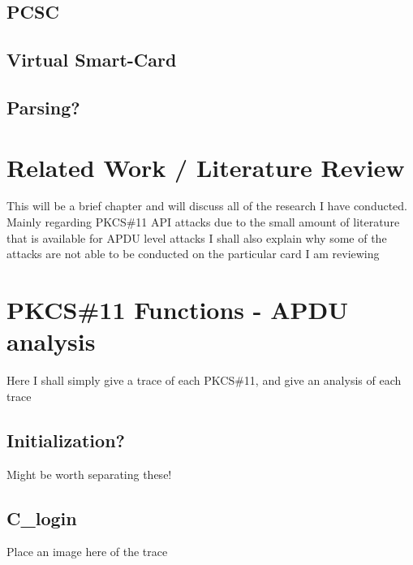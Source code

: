 \documentclass[bsc,frontabs,twoside,singlespacing,parskip,deptreport]{infthesis}     %
\begin{document}
\section{PCSC}

\section{Virtual Smart-Card}

\section{Parsing?}







\chapter{Related Work / Literature Review}

This will be a brief chapter and will discuss all of the research I have conducted.\\
Mainly regarding PKCS\#11 API attacks due to the small amount of literature that is available for APDU level attacks
I shall also explain why some of the attacks are not able to be conducted on the particular card I am reviewing







\chapter{PKCS\#11 Functions - APDU analysis}

Here I shall simply give a trace of each PKCS\#11, and give an analysis of each trace

\section{Initialization?}
Might be worth separating these!
\section{C\_login}
Place an image here of the trace
\end{document}

